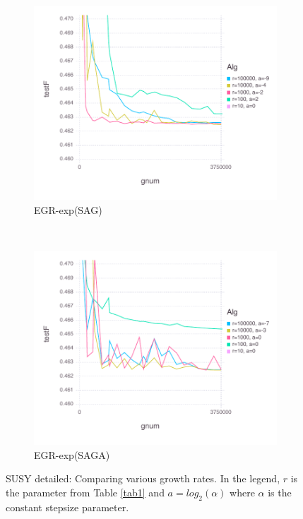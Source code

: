 \documentclass[11pt]{article}
\begin{document}
\begin{figure}[H]
          \begin{subfigure}[b]{0.45\textwidth}
              \includegraphics[width=\textwidth]{Figures/SUSYBLtrueffFinal-expfalse.pdf}
              \caption{EGR-exp(SAG)}
          \end{subfigure}
          ~ %
            \begin{subfigure}[b]{0.45\textwidth}
                \includegraphics[width=\textwidth]{Figures/SUSYBLtrueffFinal-exptrue.pdf}
                \caption{EGR-exp(SAGA)}
            \end{subfigure}
          \caption{SUSY detailed: Comparing various growth rates. In the legend, $r$ is the parameter from Table \ref{tab1} and $a=log_2(\alpha)$ where $\alpha$ is the constant stepsize parameter.}\label{fig:SUSY}
      \end{figure}
\end{document}
